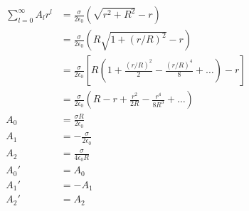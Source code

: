 \documentclass{article}
\begin{document}
\begin{enumerate}
        \begin{align*}
          \sum_{l = 0}^\infty A_l r^l & = \frac{\sigma}{2 \epsilon_0} \left( \sqrt{r^2 + R^2} - r \right)                                                        \\
                                      & = \frac{\sigma}{2 \epsilon_0} \left( R \sqrt{1 + (r / R)^2} - r \right)                                                  \\
                                      & = \frac{\sigma}{2 \epsilon_0} \left[ R \left( 1 + \frac{(r / R)^2}{2} - \frac{(r / R)^4}{8} + \ldots \right) - r \right] \\
                                      & = \frac{\sigma}{2 \epsilon_0} \left( R - r + \frac{r^2}{2 R} - \frac{r^4}{8 R^3} + \ldots \right)                        \\
          A_0                         & = \frac{\sigma R}{2 \epsilon_0}                                                                                          \\
          A_1                         & = -\frac{\sigma}{2 \epsilon_0}                                                                                           \\
          A_2                         & = \frac{\sigma}{4 \epsilon_0 R}                                                                                          \\
          A_0'                        & = A_0                                                                                                                    \\
          A_1'                        & = -A_1                                                                                                                   \\
          A_2'                        & = A_2
        \end{align*}
\end{enumerate}

\subsection{}
\end{document}
